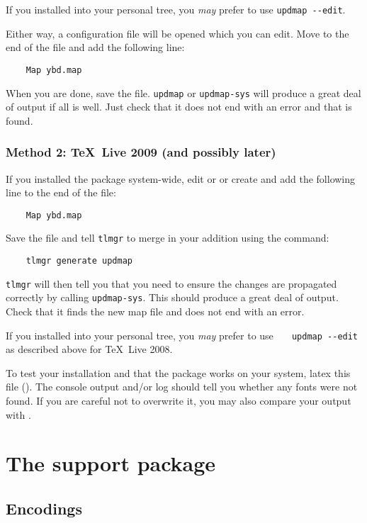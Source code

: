 \documentclass[11pt,british]{article}
\begin{document}
If you installed into your personal tree, you \emph{may} prefer to use	\verb|updmap --edit|.

Either way, a configuration file will be opened which you can edit. Move to the end of the file and add the following line:
\begin{verbatim}
	Map ybd.map
\end{verbatim}
When you are done, save the file. \verb|updmap| or \verb|updmap-sys| will produce a great deal of output if all is well. Just check that it does not end with an error and that  is found.

\subsubsection{Method 2: \TeX~Live 2009 (and possibly later)}

If you installed the package system-wide, edit or or create  and add the following line to the end of the file:
\begin{verbatim}
	Map ybd.map
\end{verbatim}
Save the file and tell \verb|tlmgr| to merge in your addition using the command:
\begin{verbatim}
	tlmgr generate updmap
\end{verbatim}
\verb|tlmgr| will then tell you that you need to ensure the changes are propagated correctly by calling \verb|updmap-sys|. This should produce a great deal of output. Check that it finds the new map file and does not end with an error.

If you installed into your personal tree, you \emph{may} prefer to use \verb|	updmap --edit| as described above for \TeX~Live 2008.

To test your installation and that the package works on your system, latex this file (). The console output and/or log should tell you whether any fonts were not found. If you are careful not to overwrite it, you may also compare your output with .

\section{The support package}\label{sec:support}

\subsection{Encodings}\label{sec:encs}
\end{document}
